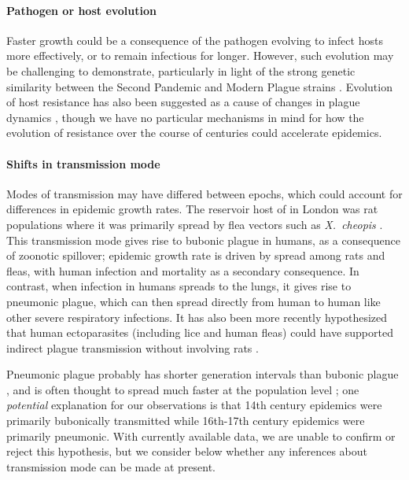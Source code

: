 \paragraph{Pathogen or host evolution}

Faster growth could be a consequence of the pathogen evolving to infect hosts more effectively, or to remain infectious for longer.  However, such evolution may be challenging to demonstrate, particularly in light of the strong genetic similarity between the Second Pandemic and Modern Plague strains \cite{Bos+11}. Evolution of host resistance has also been suggested as a cause of changes in plague dynamics \cite{LewnTown16}, though we have no particular mechanisms in mind for how the evolution of resistance over the course of centuries could accelerate epidemics.

\paragraph{Shifts in transmission mode}

Modes of transmission may have differed between epochs, which could account for differences in epidemic growth rates.  The reservoir host of \ypestis in London was rat populations where it was primarily spread by flea vectors such as {{\em X.~cheopis}} \cite[p.\,54]{PerrFeth97}. This transmission mode gives rise to bubonic plague in humans, as a consequence of zoonotic spillover; epidemic growth rate is driven by spread among rats and fleas, with human infection and mortality as a secondary consequence. In contrast, when \ypestis infection in humans spreads to  the lungs, it gives rise to pneumonic plague, which can then spread directly from human to human like other severe respiratory infections.
It has also been more recently hypothesized that human ectoparasites (including lice and human fleas) could have supported indirect plague transmission without involving rats \cite{Dean+18,Laro+18}. 

Pneumonic plague probably has shorter generation intervals than bubonic plague \cite{GaniLeac04,LaPerriere+2009}, and is often thought to spread much faster at the population level \cite{GaniLeac04}; one \emph{potential} explanation for our observations is that 14th century epidemics were primarily bubonically transmitted while 16th-17th century epidemics were primarily pneumonic.  With currently available data, we are unable to confirm or reject this hypothesis, but we consider below whether any inferences about transmission mode can be made at present.

